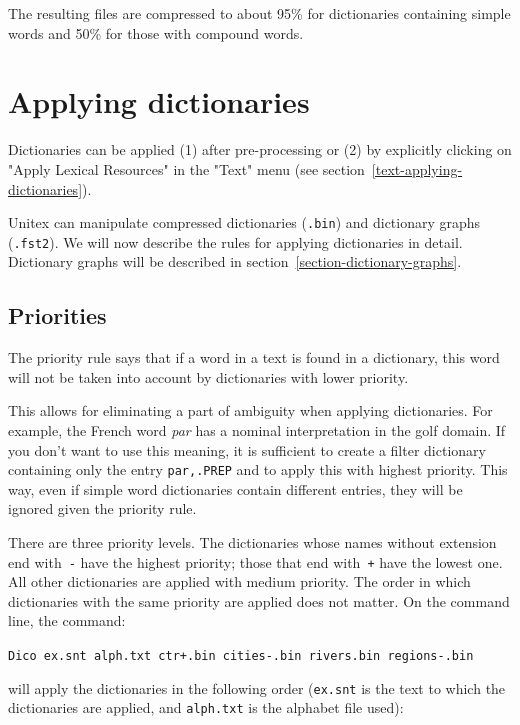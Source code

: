 \bigskip
\noindent The resulting files are compressed to about 95\% for dictionaries containing
simple words and 50\% for those with compound words.

\section{Applying dictionaries}
\label{section-applying-dictionaries}
Dictionaries can be applied (1) after pre-processing or (2) by explicitly 
clicking on "Apply Lexical Resources" in the  "Text" menu (see
section~\ref{text-applying-dictionaries}).

\bigskip
\noindent Unitex can manipulate compressed dictionaries (\verb+.bin+) and
dictionary graphs (\verb+.fst2+). We will now describe  the rules for applying dictionaries
in detail. Dictionary graphs will be described in
section~\ref{section-dictionary-graphs}.

\subsection{Priorities}
\label{section-dictionary-priorities}
The priority rule says that  if a word in a text is found in a dictionary, this
word will not be taken into account by dictionaries with lower priority.

\bigskip
\noindent This allows for eliminating a part of ambiguity when applying
dictionaries. For example, the French word \textit{par} has a nominal interpretation in the golf
domain. If you don't want to use this meaning, it is sufficient to create a
filter dictionary containing only the entry \verb$par,.PREP$ and to apply this
with highest priority. This way, even if simple word dictionaries contain 
different entries, they will be ignored given the priority rule.

\bigskip
\noindent There are three priority levels. The dictionaries whose names without
extension end with~\verb+-+
\index{\verb+-+}\index{\verb-+-}
have the highest priority; those that end with~\verb-+- have the lowest one.
All other dictionaries are applied with medium priority. The order in which
dictionaries with the same priority are applied does not matter.
On the command line, the command:

\bigskip
\noindent
\verb$Dico ex.snt alph.txt ctr+.bin cities-.bin rivers.bin regions-.bin$

\bigskip \noindent will apply the dictionaries in the following order
(\verb+ex.snt+ is the text to which the dictionaries are applied, and 
\verb+alph.txt+ is the alphabet file used):

